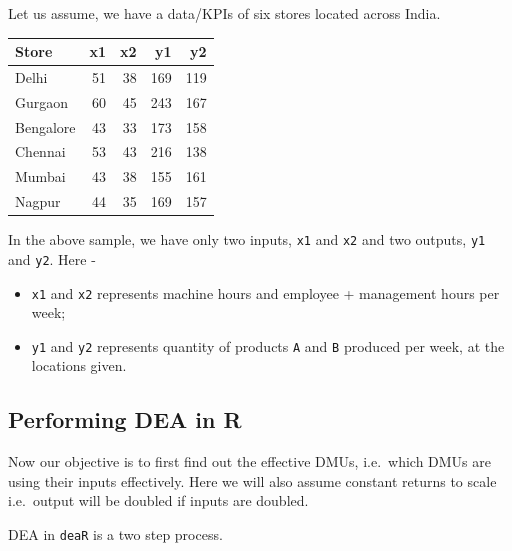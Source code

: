 \documentclass[
]{book}
\providecommand{\tightlist}{%
  \setlength{\itemsep}{0pt}\setlength{\parskip}{0pt}}
\begin{document}
Let us assume, we have a data/KPIs of six stores located across India.

\begin{tabular}{l|r|r|r|r}
\hline
Store & x1 & x2 & y1 & y2\\
\hline
Delhi & 51 & 38 & 169 & 119\\
\hline
Gurgaon & 60 & 45 & 243 & 167\\
\hline
Bengalore & 43 & 33 & 173 & 158\\
\hline
Chennai & 53 & 43 & 216 & 138\\
\hline
Mumbai & 43 & 38 & 155 & 161\\
\hline
Nagpur & 44 & 35 & 169 & 157\\
\hline
\end{tabular}

In the above sample, we have only two inputs, \texttt{x1} and \texttt{x2} and two outputs, \texttt{y1} and \texttt{y2}. Here -

\begin{itemize}
\tightlist
\item
  \texttt{x1} and \texttt{x2} represents machine hours and employee + management hours per week;
\item
  \texttt{y1} and \texttt{y2} represents quantity of products \texttt{A} and \texttt{B} produced per week, at the locations given.
\end{itemize}

\hypertarget{performing-dea-in-r}{%
\subsection{Performing DEA in R}\label{performing-dea-in-r}}

Now our objective is to first find out the effective DMUs, i.e.~which DMUs are using their inputs effectively. Here we will also assume constant returns to scale i.e.~output will be doubled if inputs are doubled.

DEA in \texttt{deaR} is a two step process.
\end{document}

